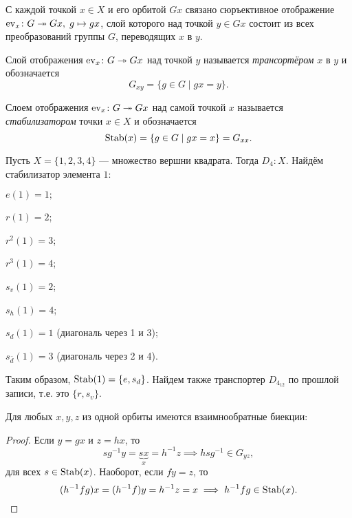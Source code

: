 С каждой точкой $x \in X$ и его орбитой $Gx$ связано сюръективное отображение $\operatorname{ev}_x \colon G \twoheadrightarrow Gx,\; g \mapsto gx$, слой которого над точкой $y \in Gx$ состоит из всех преобразований группы $G$, переводящих $x$ в $y$. 
\begin{definition}
    [Транспортёр]
    Слой отображения $\operatorname{ev}_x \colon G \twoheadrightarrow Gx$ над точкой $y$ называется \emph{трансортёром} $x$ в $y$ и обозначается \[G_{xy} = \{g \in G \mid gx = y\}.\]
\end{definition}
\begin{definition}[Стабилизатор]
    Слоем отображения $\operatorname{ev}_x \colon G \twoheadrightarrow Gx$ над самой точкой $x$ называется \emph{стабилизатором} точки $x \in X$ и обозначается \[ \operatorname{Stab}(x) = \{g \in G \mid gx = x \} = G_{xx}.\]
\end{definition}

\begin{example}
    Пусть $X = \{1, 2, 3, 4\}$ --- множество вершни квадрата. Тогда $D_4 \colon X$. Найдём стабилизатор элемента $1$: 
    \begin{bullets}
        \item $e(1) = 1;$
        \item $r(1) = 2$;
        \item $r^2(1) = 3$;
        \item $r^3(1) = 4$;
        \item $s_v (1) = 2$;
        \item $s_h(1) = 4$;
        \item $s_d(1) = 1$ (диагональ через 1 и 3);
        \item $s_{\bar d}(1) = 3$ (диагональ через 2 и 4).
    \end{bullets}
    Таким образом, $\operatorname{Stab}(1) = \{e, s_d\}$.
    Найдем также транспортер $D_{4_{12}}$ по прошлой записи, т.е. это $\{r, s_v\}$.
\end{example}

\begin{lemma}\label{lem:orb_trans}
    Для любых $x, y, z$ из одной орбиты имеются взаимнообратные биекции:
    \begin{center}
    \end{center}
\end{lemma}
\begin{proof}
    Если $y = gx$ и $z = hx$, то $$sg^{-1}y = \underbrace{sx}_{x} = h^{-1}z \implies hsg^{-1} \in G_{yz}, $$
    для всех $s \in \operatorname{Stab}(x)$. Наоборот, если $fy = z$, то \[
        (h^{-1}fg)x = (h^{-1}f)y = {h^{-1}}z = x \implies h^{-1}fg \in \operatorname{Stab}(x).
    \]
\end{proof}

